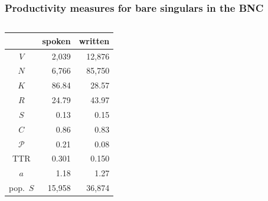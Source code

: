 \documentclass[handout,notes=show,t]{beamer} %
\begin{document}
\begin{frame}[c]
  \frametitle{Productivity measures for bare singulars in the BNC}

  \begin{columns}[c]
    \begin{column}{6cm}
      \centering
      \begin{tabular}{c@{$\qquad$}r@{$\qquad$}r}
        \toprule
        &    spoken &   written \\
        \midrule
        $V$     &  2,039 & 12,876 \\
        $N$     &  6,766 & 85,750 \\
        \midrule
        $K$     &    86.84 &    28.57 \\
        $R$     &    24.79 &    43.97 \\
        $S$     &     0.13 &     0.15 \\
        $C$     &     0.86 &     0.83 \\
        $\mathcal{P}$     &     0.21 &     0.08 \\
        TTR   &     0.301 &     0.150 \\
        $a$     &     1.18 &     1.27 \\
        pop.\ $S$ & 15,958 & 36,874 \\
        \bottomrule
      \end{tabular}
    \end{column}
    \begin{column}{6cm}
    \end{column}
  \end{columns}
\end{frame}
\end{document}

